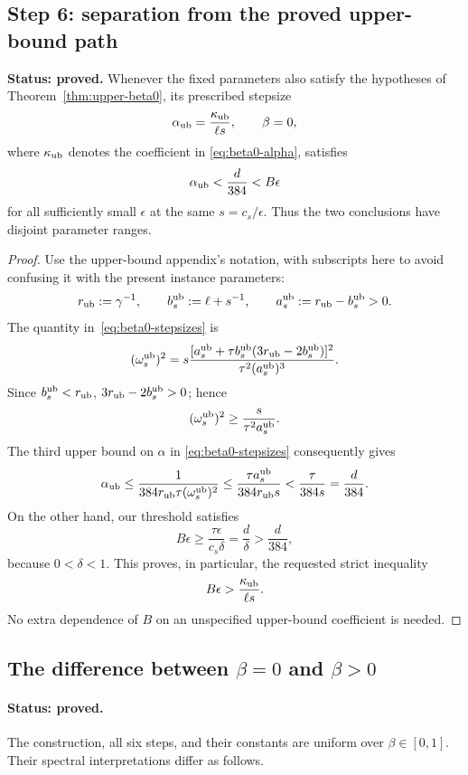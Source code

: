 \subsection{Step 6: separation from the proved upper-bound path}
\label{subsec:q3-large-upper-separation}

\begin{proposition}
\label{prop:q3-large-upper-separation}
\textbf{Status: proved.}
Whenever the fixed parameters also satisfy the hypotheses of
Theorem~\ref{thm:upper-beta0}, its prescribed stepsize
\[
\alpha_{\rm ub}=\frac{\kappa_{\rm ub}}{\ell s},\qquad\beta=0,
\]
where \(\kappa_{\rm ub}\) denotes the coefficient in
\eqref{eq:beta0-alpha}, satisfies
\[
\alpha_{\rm ub}<\frac{d}{384}<B\epsilon
\]
for all sufficiently small \(\epsilon\) at the same
\(s=c_s/\epsilon\). Thus the two conclusions have disjoint
parameter ranges.
\end{proposition}

\begin{proof}
Use the upper-bound appendix's notation, with subscripts here to avoid
confusing it with the present instance parameters:
\[
r_{\rm ub}:=\gamma^{-1},\qquad
b_s^{\rm ub}:=\ell+s^{-1},\qquad
 a_s^{\rm ub}:=r_{\rm ub}-b_s^{\rm ub}>0.
\]
The quantity in~\eqref{eq:beta0-stepsizes} is
\[
(\omega_s^{\rm ub})^2
=s\frac{[a_s^{\rm ub}
 +\tau b_s^{\rm ub}(3r_{\rm ub}-2b_s^{\rm ub})]^2}
 {\tau^2(a_s^{\rm ub})^3}.
\]
Since \(b_s^{\rm ub}<r_{\rm ub}\),
\(3r_{\rm ub}-2b_s^{\rm ub}>0\); hence
\[
(\omega_s^{\rm ub})^2\ge\frac{s}{\tau^2a_s^{\rm ub}}.
\]
The third upper bound on \(\alpha\) in
\eqref{eq:beta0-stepsizes} consequently gives
\[
\alpha_{\rm ub}
\le\frac{1}{384r_{\rm ub}\tau(\omega_s^{\rm ub})^2}
\le\frac{\tau a_s^{\rm ub}}{384r_{\rm ub}s}
<\frac{\tau}{384s}=\frac{d}{384}.
\]
On the other hand, our threshold satisfies
\[
B\epsilon\ge\frac{\tau\epsilon}{c_s\delta}
=\frac{d}{\delta}>\frac{d}{384},
\]
because \(0<\delta<1\).
This proves, in particular, the requested strict inequality
\[
B\epsilon>\frac{\kappa_{\rm ub}}{\ell s}.
\]
No extra dependence of \(B\) on an unspecified upper-bound coefficient
is needed.
\end{proof}

\subsection{The difference between \(\beta=0\) and \(\beta>0\)}
\label{subsec:q3-large-beta-endpoint}

\paragraph{Status: proved.}
The construction, all six steps, and their constants are uniform over
\(\beta\in[0,1]\). Their spectral interpretations differ as follows.

